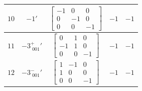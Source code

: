 \documentclass[fleqn,8pt]{jsarticle}
\begin{document}
\begin{longtable}{ccccc}
$ 10 $ & $ -1{}' $ & $ \begin{bmatrix} -1 & 0 & 0 \\ 0 & -1 & 0 \\ 0 & 0 & -1 \end{bmatrix} $ & $ -1 $ & $ -1 $ \\ \hline
$ 11 $ & $ -3^{+}_{\,\,001}{}' $ & $ \begin{bmatrix} 0 & 1 & 0 \\ -1 & 1 & 0 \\ 0 & 0 & -1 \end{bmatrix} $ & $ -1 $ & $ -1 $ \\ \hline
$ 12 $ & $ -3^{-}_{\,\,001}{}' $ & $ \begin{bmatrix} 1 & -1 & 0 \\ 1 & 0 & 0 \\ 0 & 0 & -1 \end{bmatrix} $ & $ -1 $ & $ -1 $ \\
\end{longtable}
\end{document}
